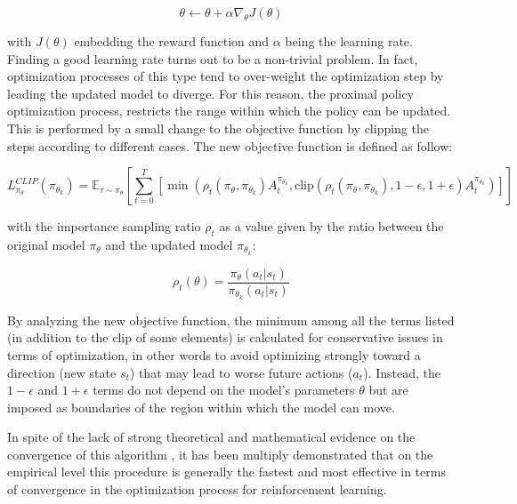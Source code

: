 \begin{equation*}
    \theta \leftarrow \theta + \alpha \nabla_\theta J(\theta)
\end{equation*}

with $J(\theta)$ embedding the reward function and $\alpha$ being the learning rate. Finding a good learning rate turns out to be a non-trivial problem. In fact, optimization processes of this type tend to over-weight the optimization step by leading the updated model to diverge. For this reason, the proximal policy optimization process, restricts the range within which the policy can be updated. This is performed by a small change to the objective function by clipping the steps according to different cases. The new objective function is defined as follow:

\begin{equation*}
    L^{CLIP}_{\pi_\theta} (\pi_{\theta_k}) = \mathbb{E}_{\tau \sim \pi_\theta} \left[ \sum^T_{t = 0} \left[ \min \left( \rho_t (\pi_\theta, \pi_{\theta_k}) A^{\pi_{\theta_k}}_t , \text{clip}(\rho_t (\pi_\theta, \pi_{\theta_k}), 1 - \epsilon, 1 + \epsilon) A_t^{\pi_{\theta_k}} \right) \right] \right]
\end{equation*}

with the importance sampling ratio $\rho_t$ as a value given by the ratio between the original model $\pi_\theta$ and the updated model $\pi_{\theta_k}$:

\begin{equation*}
    \rho_t (\theta) = \frac{\pi_\theta (a_t | s_t)}{\pi_{\theta_k} (a_t | s_t)} 
\end{equation*}

By analyzing the new objective function, the minimum among all the terms listed (in addition to the clip of some elements) is calculated for conservative issues in terms of optimization, in other words to avoid optimizing strongly toward a direction (new state $s_t$) that may lead to worse future actions ($a_t$). Instead, the $1 - \epsilon$ and $1 + \epsilon$ terms do not depend on the model's parameters $\theta$ but are imposed as boundaries of the region within which the model can move.

In spite of the lack of strong theoretical and mathematical evidence on the convergence of this algorithm \citep{schulman2017trust}, it has been multiply demonstrated that on the empirical level this procedure is generally the fastest and most effective in terms of convergence in the optimization process for reinforcement learning.

